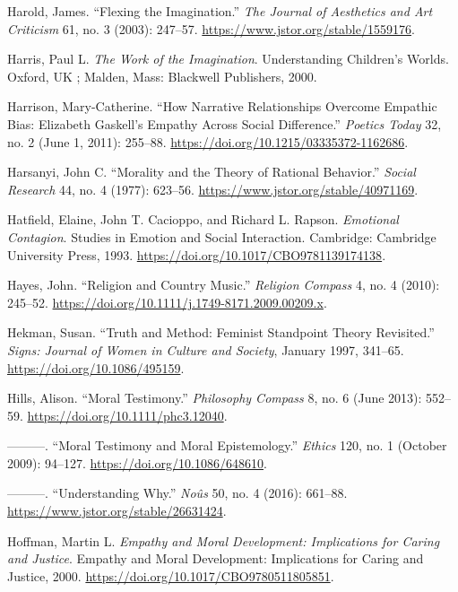 \documentclass[phdthesis,12pt,final]{wuthesis}
\newlength{\cslhangindent}
\newenvironment{CSLReferences}[2] %
{\begin{list}{}{%
	\setlength{\itemindent}{0pt}
	\setlength{\leftmargin}{0pt}
	\setlength{\parsep}{0pt}
	\ifodd #1
	\setlength{\leftmargin}{\cslhangindent}
	\setlength{\itemindent}{-1\cslhangindent}
	\fi
	\setlength{\itemsep}{#2\baselineskip}}}
{\end{list}}
\theoremstyle{definition}
\theoremstyle{definition}
\theoremstyle{definition}
\theoremstyle{definition}
\theoremstyle{remark}
\begin{document}
\begin{CSLReferences}{1}{0}
Harold, James. {``Flexing the {Imagination}.''} \emph{The Journal of Aesthetics and Art Criticism} 61, no. 3 (2003): 247--57. \url{https://www.jstor.org/stable/1559176}.

Harris, Paul L. \emph{The {Work} of the {Imagination}}. Understanding {Children}'s {Worlds}. Oxford, UK ; Malden, Mass: Blackwell Publishers, 2000.

Harrison, Mary-Catherine. {``How {Narrative Relationships Overcome Empathic Bias}: {Elizabeth Gaskell}'s {Empathy} Across {Social Difference}.''} \emph{Poetics Today} 32, no. 2 (June 1, 2011): 255--88. \url{https://doi.org/10.1215/03335372-1162686}.

Harsanyi, John C. {``Morality and the {Theory} of {Rational Behavior}.''} \emph{Social Research} 44, no. 4 (1977): 623--56. \url{https://www.jstor.org/stable/40971169}.

Hatfield, Elaine, John T. Cacioppo, and Richard L. Rapson. \emph{Emotional {Contagion}}. Studies in {Emotion} and {Social Interaction}. Cambridge: Cambridge University Press, 1993. \url{https://doi.org/10.1017/CBO9781139174138}.

Hayes, John. {``Religion and {Country Music}.''} \emph{Religion Compass} 4, no. 4 (2010): 245--52. \url{https://doi.org/10.1111/j.1749-8171.2009.00209.x}.

Hekman, Susan. {``Truth and Method: {Feminist} Standpoint Theory Revisited.''} \emph{Signs: Journal of Women in Culture and Society}, January 1997, 341--65. \url{https://doi.org/10.1086/495159}.

Hills, Alison. {``Moral {Testimony}.''} \emph{Philosophy Compass} 8, no. 6 (June 2013): 552--59. \url{https://doi.org/10.1111/phc3.12040}.

---------. {``Moral Testimony and Moral Epistemology.''} \emph{Ethics} 120, no. 1 (October 2009): 94--127. \url{https://doi.org/10.1086/648610}.

---------. {``Understanding {Why}.''} \emph{Noûs} 50, no. 4 (2016): 661--88. \url{https://www.jstor.org/stable/26631424}.

Hoffman, Martin L. \emph{Empathy and Moral Development: {Implications} for Caring and Justice}. Empathy and Moral Development: {Implications} for Caring and Justice, 2000. \url{https://doi.org/10.1017/CBO9780511805851}.


\end{CSLReferences}
\end{document}
